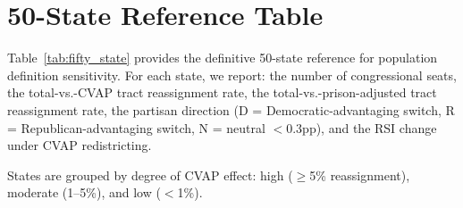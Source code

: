 \section{50-State Reference Table}
\label{sec:fifty_state_table}

Table~\ref{tab:fifty_state} provides the definitive 50-state reference for population definition sensitivity. For each state, we report: the number of congressional seats, the total-vs.-CVAP tract reassignment rate, the total-vs.-prison-adjusted tract reassignment rate, the partisan direction (D = Democratic-advantaging switch, R = Republican-advantaging switch, N = neutral $<$0.3pp), and the RSI change under CVAP redistricting.

States are grouped by degree of CVAP effect: high ($\geq$5\% reassignment), moderate (1--5\%), and low ($<$1\%).

